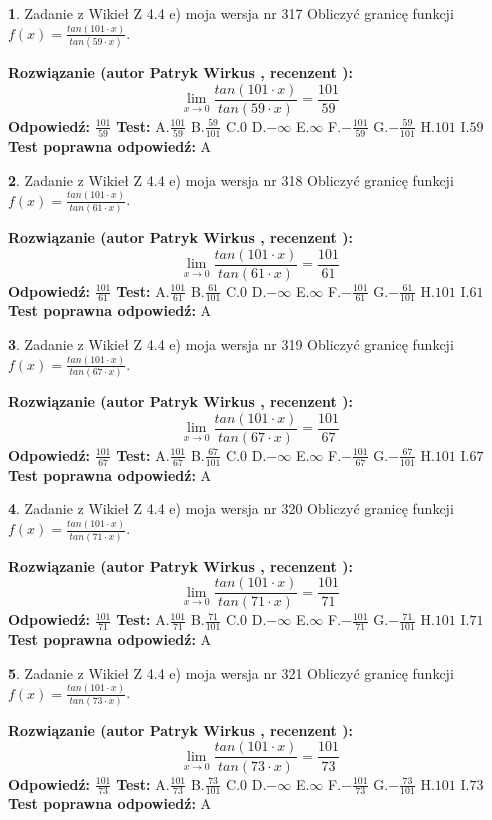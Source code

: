 \documentclass[12pt, a4paper]{article}
\theoremstyle{definition} %
\newtheorem{zad}{}
\newcommand{\zadStart}[1]{\begin{zad}#1\newline}
\newcommand{\zadStop}{\end{zad}}
\newcommand{\rozwStart}[2]{\noindent \textbf{Rozwiązanie (autor #1 , recenzent #2): }\newline}
\newcommand{\rozwStop}{\newline}
\newcommand{\odpStart}{\noindent \textbf{Odpowiedź:}\newline}
\newcommand{\odpStop}{\newline}
\newcommand{\testStart}{\noindent \textbf{Test:}\newline}
\newcommand{\testStop}{\newline}
\newcommand{\kluczStart}{\noindent \textbf{Test poprawna odpowiedź:}\newline}
\newcommand{\kluczStop}{\newline}
\begin{document}
\zadStart{Zadanie z Wikieł Z 4.4 e) moja wersja nr 317}
Obliczyć granicę funkcji $f(x)=\frac{tan(101\cdot x)}{tan(59\cdot x)}$.
\zadStop
\rozwStart{Patryk Wirkus}{}
$$\lim\limits_{x\to 0}\frac{tan(101\cdot x)}{tan(59\cdot x)}=
\frac{101}{59}$$
\rozwStop
\odpStart
$\frac{101}{59}$
\odpStop
\testStart
A.$\frac{101}{59}$
B.$\frac{59}{101}$
C.$0$
D.$-\infty$
E.$\infty$
F.$-\frac{101}{59}$
G.$-\frac{59}{101}$
H.$101$
I.$59$
\testStop
\kluczStart
A
\kluczStop



\zadStart{Zadanie z Wikieł Z 4.4 e) moja wersja nr 318}
Obliczyć granicę funkcji $f(x)=\frac{tan(101\cdot x)}{tan(61\cdot x)}$.
\zadStop
\rozwStart{Patryk Wirkus}{}
$$\lim\limits_{x\to 0}\frac{tan(101\cdot x)}{tan(61\cdot x)}=
\frac{101}{61}$$
\rozwStop
\odpStart
$\frac{101}{61}$
\odpStop
\testStart
A.$\frac{101}{61}$
B.$\frac{61}{101}$
C.$0$
D.$-\infty$
E.$\infty$
F.$-\frac{101}{61}$
G.$-\frac{61}{101}$
H.$101$
I.$61$
\testStop
\kluczStart
A
\kluczStop



\zadStart{Zadanie z Wikieł Z 4.4 e) moja wersja nr 319}
Obliczyć granicę funkcji $f(x)=\frac{tan(101\cdot x)}{tan(67\cdot x)}$.
\zadStop
\rozwStart{Patryk Wirkus}{}
$$\lim\limits_{x\to 0}\frac{tan(101\cdot x)}{tan(67\cdot x)}=
\frac{101}{67}$$
\rozwStop
\odpStart
$\frac{101}{67}$
\odpStop
\testStart
A.$\frac{101}{67}$
B.$\frac{67}{101}$
C.$0$
D.$-\infty$
E.$\infty$
F.$-\frac{101}{67}$
G.$-\frac{67}{101}$
H.$101$
I.$67$
\testStop
\kluczStart
A
\kluczStop



\zadStart{Zadanie z Wikieł Z 4.4 e) moja wersja nr 320}
Obliczyć granicę funkcji $f(x)=\frac{tan(101\cdot x)}{tan(71\cdot x)}$.
\zadStop
\rozwStart{Patryk Wirkus}{}
$$\lim\limits_{x\to 0}\frac{tan(101\cdot x)}{tan(71\cdot x)}=
\frac{101}{71}$$
\rozwStop
\odpStart
$\frac{101}{71}$
\odpStop
\testStart
A.$\frac{101}{71}$
B.$\frac{71}{101}$
C.$0$
D.$-\infty$
E.$\infty$
F.$-\frac{101}{71}$
G.$-\frac{71}{101}$
H.$101$
I.$71$
\testStop
\kluczStart
A
\kluczStop



\zadStart{Zadanie z Wikieł Z 4.4 e) moja wersja nr 321}
Obliczyć granicę funkcji $f(x)=\frac{tan(101\cdot x)}{tan(73\cdot x)}$.
\zadStop
\rozwStart{Patryk Wirkus}{}
$$\lim\limits_{x\to 0}\frac{tan(101\cdot x)}{tan(73\cdot x)}=
\frac{101}{73}$$
\rozwStop
\odpStart
$\frac{101}{73}$
\odpStop
\testStart
A.$\frac{101}{73}$
B.$\frac{73}{101}$
C.$0$
D.$-\infty$
E.$\infty$
F.$-\frac{101}{73}$
G.$-\frac{73}{101}$
H.$101$
I.$73$
\testStop
\kluczStart
A
\kluczStop
\end{document}
